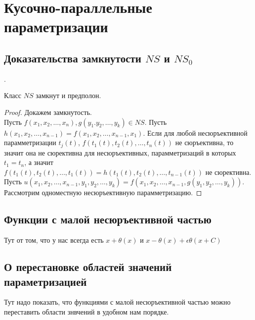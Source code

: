 \documentclass[main.tex]{subfiles}
\begin{document}
\section{Кусочно-параллельные параметризации}
\subsection{Доказательства замкнутости $NS$ и $NS_0$}.
\begin{lemma}
    Класс $NS$ замкнут и предполон.
\end{lemma}
\begin{proof}
    Докажем замкнутость. \\
    Пусть $f(x_1, x_2, \ldots, x_n), g(y_1. y_2, \ldots, y_k) \in NS$. 
    Пусть $h(x_1, x_2, \ldots, x_{n-1}) = f(x_1, x_2, \ldots, x_{n-1}, x_1)$. Если для любой несюръективной парамметризации $t_j(t)$,
    $f(t_1(t), t_2(t), \ldots, t_n(t))$ не сюръективна, то значит она не сюрективна для несюръективных, парамметризаций в которых $t_1 = t_n$,
    а значит $f(t_1(t), t_2(t), \ldots, t_1(t)) = h(t_1(t), t_2(t), \ldots, t_{n-1}(t))$ не сюрективна.\\
    Пусть $u(x_1, x_2, \ldots, x_{n-1}, y_1, y_2, \ldots, y_k) = f(x_1, x_2, \ldots, x_{n-1}, g(y_1, y_2, \ldots, y_k))$. Рассмотрим одноместную несюръективную парамметризацию.
\end{proof}

\subsection{Функции с малой несюръективной частью}
Тут от том, что у нас всегда есть $x + \theta(x)$ и $x-\theta(x) + \epsilon \theta(x+C)$

\subsection{О перестановке областей значений параметризацией}
Тут надо показать, что функциями с малой несюръективной частью можно переставить области знвчений в удобном нам порядке.
  
\end{document}
